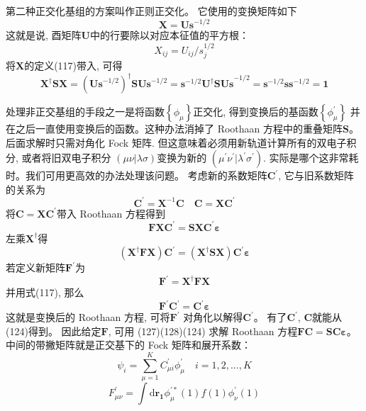 \documentclass[]{article}
\begin{document}
第二种正交化基组的方案叫作正则正交化。 它使用的变换矩阵如下
\begin{equation}
	\mathbf{X}=\mathbf{Us}^{-1/2}
\end{equation}
这就是说, 酉矩阵$\mathbf{U}$中的行要除以对应本征值的平方根：
\begin{equation}
	X_{ij}=U_{ij}/s^{1/2}_j
\end{equation}
将$\mathbf{X}$的定义(117)带入, 可得
\begin{equation}
	\mathbf{X^{\dagger}SX}=(\mathbf{Us}^{-1/2})^{\dagger}\mathbf{SUs}^{-1/2}=\mathbf{s}^{-1/2}\mathbf{U^{\dagger}SUs}^{-1/2}=\mathbf{s}^{-1/2}\mathbf{ss}^{-1/2}=\mathbf{1}
\end{equation}

处理非正交基组的手段之一是将函数$\left\lbrace \phi_{\mu}\right\rbrace $正交化, 得到变换后的基函数$\left\lbrace \phi^{\prime}_{\mu}\right\rbrace $ 并在之后一直使用变换后的函数。这种办法消掉了 Roothaan 方程中的重叠矩阵$\mathbf{S}$。 后面求解时只需对角化 Fock 矩阵. 但这意味着必须用新轨道计算所有的双电子积分, 或者将旧双电子积分 $(\mu\nu|\lambda\sigma)$变换为新的 $(\mu^{\prime}\nu^{\prime}|\lambda^{\prime}\sigma^{\prime})$. 实际是哪个这非常耗时。我们可用更高效的办法处理该问题。 考虑新的系数矩阵$\mathbf{C^{\prime}}$, 它与旧系数矩阵的关系为
\begin{equation}
	\mathbf{C^{\prime}}=\mathbf{X}^{-1}\mathbf{C}\quad \mathbf{C}=\mathbf{XC^{\prime}}
\end{equation}
将$\mathbf{C}=\mathbf{XC^{\prime}}$带入 Roothaan 方程得到
\begin{equation}
	\mathbf{FXC^{\prime}}=\mathbf{SXC^{\prime}\varepsilon}
\end{equation}
左乘$\mathbf{X^{\dagger}}$得
\begin{equation}
	(\mathbf{X^{\dagger}FX})\mathbf{C^{\prime}}=(\mathbf{X^{\dagger}SX})\mathbf{C^{\prime}\varepsilon}
\end{equation}
若定义新矩阵$\mathbf{F^{\prime}}$为
\begin{equation}
	\mathbf{F^{\prime}}=\mathbf{X^{\dagger}FX}
\end{equation}
并用式(117), 那么
\begin{equation}
	\mathbf{F^{\prime}C^{\prime}}=\mathbf{C^{\prime}\varepsilon}
\end{equation}
这就是变换后的 Roothaan 方程, 可将$\mathbf{F^{\prime}}$ 对角化以解得$\mathbf{C^{\prime}}$。 有了$\mathbf{C^{\prime}}$, $\mathbf{C}$就能从 (124)得到。 因此给定$\mathbf{F}$, 可用 (127)(128)(124) 求解 Roothaan 方程$\mathbf{FC}=\mathbf{SC\varepsilon}$。中间的带撇矩阵就是正交基下的 Fock 矩阵和展开系数：
\begin{equation}
	\psi_i=\sum\limits^K_{\mu=1}C^{\prime}_{\mu i}\phi^{\prime}_{\mu}\quad i=1,2,...,K
\end{equation}
\begin{equation}
	F^{\prime}_{\mu\nu}=\int\mathrm{d}\mathbf{r_1}\phi^{\prime *}_{\mu}(1)f(1)\phi^{\prime}_{\nu}(1)
\end{equation}
\end{document}
